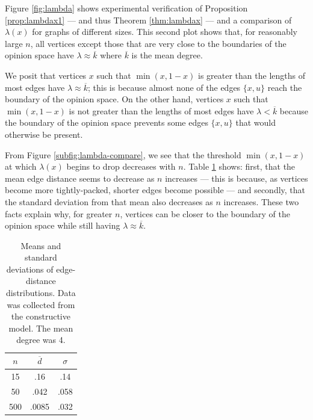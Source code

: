\documentclass[a4paper,10pt]{article}
\begin{document}
Figure \ref{fig:lambda} shows experimental verification of Proposition \ref{prop:lambdax1} --- and thus Theorem \ref{thm:lambdax} --- and a comparison of $\lambda(x)$ for graphs of different sizes. This second plot shows that, for reasonably large $n$, all vertices except those that are very close to the boundaries of the opinion space have $\lambda \approx \overline{k}$ where $\overline{k}$ is the mean degree. 

We posit that vertices $x$ such that $\min(x, 1 - x)$ is greater than the lengths of most edges have $\lambda \approx \overline{k}$; this is because almost none of the edges $\{x, u\}$ reach the boundary of the opinion space. On the other hand, vertices $x$ such that $\min(x, 1 - x)$ is not greater than the lengths of most edges have $\lambda < \overline{k}$ because the boundary of the opinion space prevents some edges $\{x, u\}$ that would otherwise be present. 

From Figure \ref{subfig:lambda-compare}, we see that the threshold $\min(x, 1 - x)$ at which $\lambda(x)$ begins to drop decreases with $n$. Table \ref{tbl:dist-distro} shows: first, that the mean edge distance seems to decrease as $n$ increases --- this is because, as vertices become more tightly-packed, shorter edges become possible --- and secondly, that the standard deviation from that mean also decreases as $n$ increases. These two facts explain why, for greater $n$, vertices can be closer to the boundary of the opinion space while still having $\lambda \approx \overline{k}.$

\begin{table}
\centering
\begin{tabular}{ c | c | c }
  $n$ & $\overline{d}$ & $\sigma$ \\ \hline
  15 & .16 & .14 \\
  50 & .042 & .058 \\
  500 & .0085 & .032 \\
\end{tabular}
\caption{Means and standard deviations of edge-distance distributions. Data was collected from the constructive model. The mean degree was 4.}
\label{tbl:dist-distro}
\end{table}

\newpage
\end{document}
